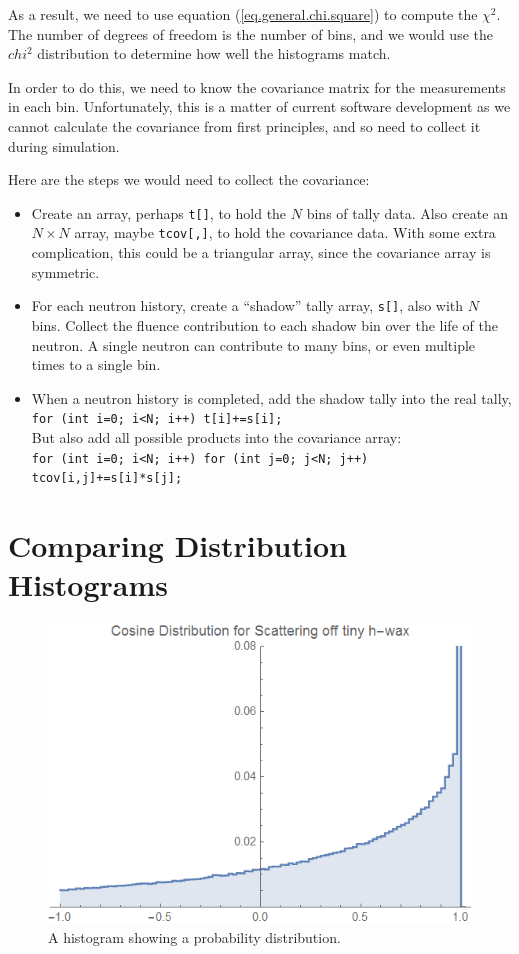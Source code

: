 \documentclass[letterpaper,12pt]{article}
\begin{document}
As a result, we need to use equation (\ref{eq.general.chi.square}) to compute the $\chi^2$. The number of degrees of freedom is the number of bins, and we would use the $chi^2$ distribution to determine how well the histograms match.

In order to do this, we need to know the covariance matrix for the measurements in each bin.  Unfortunately, this is a matter of current software development as we cannot calculate the covariance from first principles, and so need to collect it during simulation.

Here are the steps we would need to collect the covariance:

\begin{itemize}
	\item Create an array, perhaps \texttt{t[]}, to hold the $N$ bins of tally data. Also create an $N\times N$ array, maybe \texttt{tcov[,]}, to hold the covariance data. With some extra complication, this could be a triangular array, since the covariance array is symmetric.
	\item For each neutron history, create a ``shadow'' tally array, \texttt{s[]}, also with $N$ bins. Collect the fluence contribution to each shadow bin over the life of the neutron. A single neutron can contribute to many bins, or even multiple times to a single bin.
	\item When a neutron history is completed, add the shadow tally into the real tally,\\
	\texttt{for (int i=0; i<N; i++) t[i]+=s[i];} \\
	But also add all possible products into the covariance array:\\ 
	\texttt{for (int i=0; i<N; i++) for (int j=0; j<N; j++) tcov[i,j]+=s[i]*s[j];} \\
\end{itemize}

\section{Comparing Distribution Histograms}

\begin{figure}[ht] 
	\centering	\includegraphics[width=0.7\columnwidth]{CosineDistributionMCNP}
	\caption{
		\label{fig.cosine}
		A histogram showing a probability distribution.
	}
\end{figure}
\end{document}
